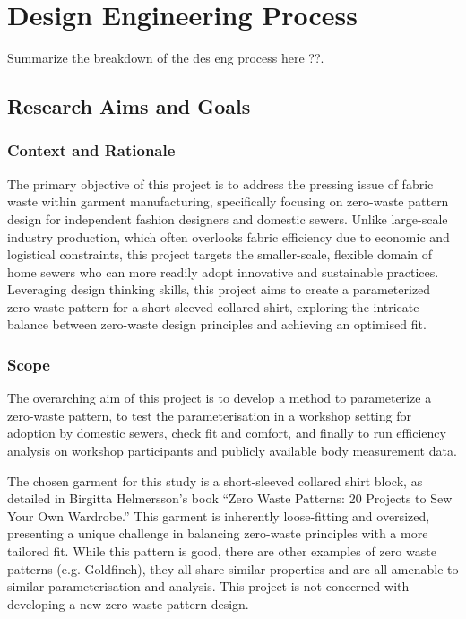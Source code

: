 \chapter{Design Engineering Process} 
Summarize the breakdown of the des eng process here ??.

\section{Research Aims and Goals}

\subsection{Context and Rationale}
The primary objective of this project is to address the pressing issue of fabric waste within garment manufacturing, specifically focusing on zero-waste pattern design for independent fashion designers and domestic sewers. Unlike large-scale industry production, which often overlooks fabric efficiency due to economic and logistical constraints, this project targets the smaller-scale, flexible domain of home sewers who can more readily adopt innovative and sustainable practices. Leveraging design thinking skills, this project aims to create a parameterized zero-waste pattern for a short-sleeved collared shirt, exploring the intricate balance between zero-waste design principles and achieving an optimised fit.

\subsection{Scope}
The overarching aim of this project is to develop a method to parameterize a zero-waste pattern, to test the parameterisation in a workshop setting for adoption by domestic sewers, check fit and comfort, and finally to run efficiency analysis on workshop participants and publicly available body measurement data.

The chosen garment for this study is a short-sleeved collared shirt block, as detailed in Birgitta Helmersson’s book “Zero Waste Patterns: 20 Projects to Sew Your Own Wardrobe.” This garment is inherently loose-fitting and oversized, presenting a unique challenge in balancing zero-waste principles with a more tailored fit. While this pattern is good, there are other examples of zero waste patterns (e.g. Goldfinch), they all share similar properties and are all amenable to similar parameterisation and analysis. This project is not concerned with developing a new zero waste pattern design.

